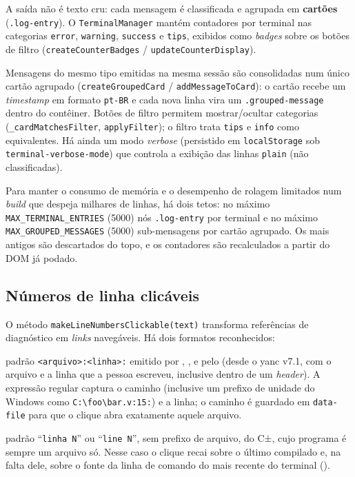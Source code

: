 A saída não é texto cru: cada mensagem é classificada e agrupada em
\textbf{cartões} (\lstinline|.log-entry|). O \lstinline|TerminalManager| mantém
contadores por terminal nas categorias \lstinline|error|, \lstinline|warning|,
\lstinline|success| e \lstinline|tips|, exibidos como \textit{badges} sobre os
botões de filtro (\lstinline|createCounterBadges| /
\lstinline|updateCounterDisplay|).

Mensagens do mesmo tipo emitidas na mesma sessão são consolidadas num único
cartão agrupado (\lstinline|createGroupedCard| / \lstinline|addMessageToCard|):
o cartão recebe um \textit{timestamp} em formato \lstinline|pt-BR| e cada nova
linha vira um \lstinline|.grouped-message| dentro do contêiner. Botões de
filtro permitem mostrar/ocultar categorias (\lstinline|_cardMatchesFilter|,
\lstinline|applyFilter|); o filtro trata \lstinline|tips| e \lstinline|info|
como equivalentes. Há ainda um modo \textit{verbose} (persistido em
\lstinline|localStorage| sob \lstinline|terminal-verbose-mode|) que controla a
exibição das linhas \lstinline|plain| (não classificadas).

\begin{nota}
Para manter o consumo de memória e o desempenho de rolagem limitados num
\textit{build} que despeja milhares de linhas, há dois tetos: no máximo
\lstinline|MAX_TERMINAL_ENTRIES| (5000) nós \lstinline|.log-entry| por terminal
e no máximo \lstinline|MAX_GROUPED_MESSAGES| (5000) sub-mensagens por cartão
agrupado. Os mais antigos são descartados do topo, e os contadores são
recalculados a partir do DOM já podado.
\end{nota}

\subsection{Números de linha clicáveis}

O método \lstinline|makeLineNumbersClickable(text)| transforma referências de
diagnóstico em \textit{links} navegáveis. Há dois formatos reconhecidos:

\begin{description}[leftmargin=*]
  \item[Estilo \textit{toolchain} C] padrão \lstinline|<arquivo>:<linha>:|
        emitido por , ,  e pelo
         (desde o yanc v7.1, com o arquivo e a linha que a pessoa
        escreveu, inclusive dentro de um \emph{header}). A expressão regular captura o caminho (inclusive um
        prefixo de unidade do Windows como \lstinline|C:\foo\bar.v:15:|) e a
        linha; o caminho é guardado em \lstinline|data-file| para que o clique
        abra exatamente aquele arquivo.
  \item[Estilo \tool{AURORA}/\tool{YANC}] padrão \enquote{\lstinline|linha N|}
        ou \enquote{\lstinline|line N|}, sem prefixo de arquivo, do C±, cujo
        programa é sempre um arquivo só. Nesse caso o clique recai sobre o último
        \cmm{} compilado e, na falta dele, sobre o fonte da linha de comando do
         mais recente do terminal
        ().
\end{description}

